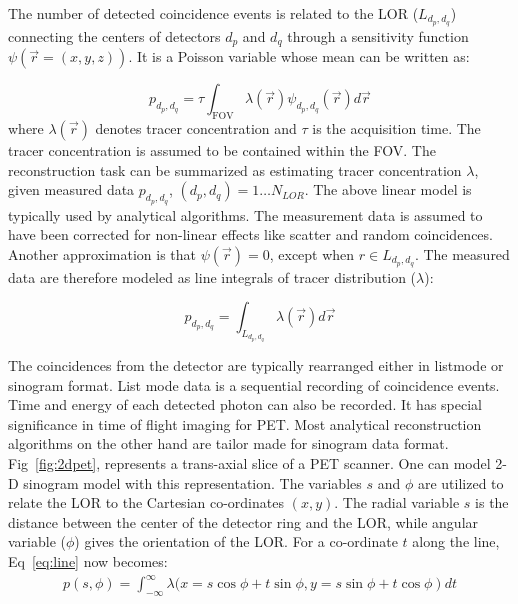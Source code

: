  The number of detected coincidence events is related to the \ac{LOR} ($L_{d_{p},d_{q}}$) connecting the centers of detectors $d_p$ and $d_q$ through a sensitivity function $\psi(\vec{r}=(x,y,z))$. It is a Poisson variable whose mean can be written as:

\begin{equation}\label{eq:analy}
p_{d_{p},d_{q}} =\tau \int_{\mathrm{FOV}} \lambda (\vec{r}) \psi_{d_{p}, d_{q}}(\vec{r}) d \vec{r}
\end{equation}
where $\lambda(\vec{r})$ denotes tracer concentration and $\tau$ is the acquisition time. The tracer concentration is assumed to be contained within the \ac{FOV}. The reconstruction task can be summarized as estimating tracer concentration $\lambda$, given measured data $p_{d_{p},d_{q}}$, $(d_{p},d_{q})=1\dots N_{LOR}$. The above linear model is typically used by analytical algorithms. The measurement data is assumed to have been corrected for non-linear effects like scatter and random coincidences. Another approximation is that $\psi(\vec{r})=0$, except when $r\in L_{d_{p},d_{q}} $. The measured data are therefore modeled as line integrals of tracer distribution ($\lambda$): 

\begin{equation}
\label{eq:line}
p_{d_{p}, d_{q}}=\int_{L_{d_{p}, d_{q}}} \lambda (\vec{r}) d \vec{r}
\end{equation}

The coincidences from the detector are typically rearranged either in listmode or sinogram format. List mode data is a sequential recording of coincidence events. Time and energy of each detected photon can also be recorded. It has special significance in time of flight imaging for \ac{PET}. Most analytical reconstruction algorithms on the other hand are tailor made for sinogram data format. Fig~\ref{fig:2dpet}, represents a trans-axial slice of a \ac{PET} scanner. One can model 2-D sinogram model with this representation. The variables $s$ and $\phi$ are utilized to relate the \ac{LOR} to the Cartesian co-ordinates $(x,y)$. The radial variable $s$ is the distance between the center of the detector ring and the \ac{LOR}, while angular variable ($\phi$) gives the orientation of the \ac{LOR}. 
For a co-ordinate $t$ along the line, Eq~\ref{eq:line} now becomes:
\begin{equation}\label{eq:line_sino}
\begin{array}{c}
p\left(s, \phi\right)=\int_{-\infty}^{\infty}  \lambda(x= s \cos\phi +t \sin \phi, 
\left.y=s \sin \phi + t \cos \phi\right) d t 
\end{array}
\end{equation}

